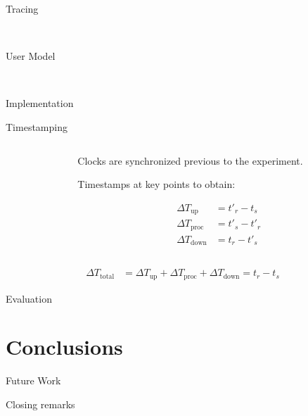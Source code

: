 \documentclass[aspectratio=1610]{beamer}
\begin{document}
\begin{frame}{Tracing}
    \begin{center}
        \\
    \end{center}
\end{frame}

\begin{frame}{User Model}
    \begin{center}
        \\
        \vspace{.1\textheight}%
    \end{center}
\end{frame}

\begin{ssframe}{Implementation}
    \begin{center}
        
    \end{center}
\end{ssframe}

\begin{frame}{Timestamping}
    \begin{columns}[onlytextwidth]
        \begin{column}{.5\linewidth}
            \footnotesize%
            \raggedright%
            
        \end{column}%
        \begin{column}{.5\linewidth}
            Clocks are synchronized previous to the experiment.

            \vspace{\baselineskip}%
            Timestamps at key points to obtain:

            \begin{align}
                {\Delta}T_\text{up} &= t'_{r} - t_{s}\\
                {\Delta}T_\text{proc} &= t'_{s} - t'_{r}\\
                {\Delta}T_\text{down} &= t_{r} - t'_{s}
            \end{align}
        \end{column}%
    \end{columns}
    \begin{align}
        {\Delta}T_\text{total} &= {\Delta}T_\text{up} + {\Delta}T_\text{proc} + {\Delta}T_\text{down} = t_{r} - t_{s}
    \end{align}
\end{frame}

\begin{ssframe}{Evaluation}

\end{ssframe}

\section{Conclusions}
\begin{ssframe}{Future Work}
    
\end{ssframe}

\begin{ssframe}{Closing remarks}
    
\end{ssframe}
\end{document}
